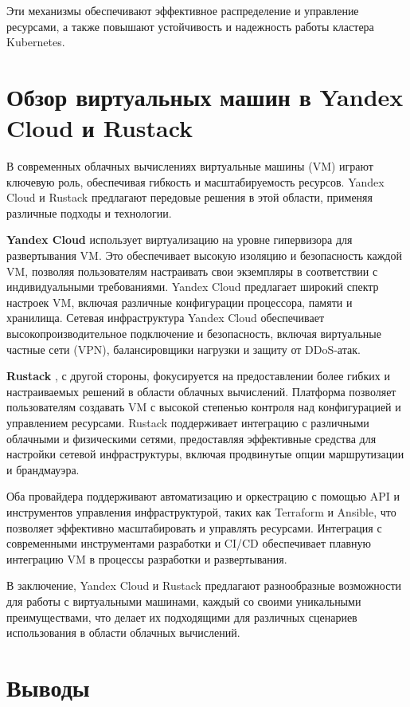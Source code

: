 Эти механизмы обеспечивают эффективное распределение и управление ресурсами, а
также повышают устойчивость и надежность работы кластера Kubernetes.

\section*{Обзор виртуальных машин в Yandex Cloud и Rustack}

В современных облачных вычислениях виртуальные машины (VM) играют ключевую роль,
обеспечивая гибкость и масштабируемость ресурсов. Yandex Cloud и Rustack
предлагают передовые решения в этой области, применяя различные подходы и
технологии.

\textbf{Yandex Cloud} \cite{yandexcloud} использует виртуализацию на уровне
гипервизора для
развертывания VM. Это обеспечивает высокую изоляцию и безопасность каждой VM,
позволяя пользователям настраивать свои экземпляры в соответствии с
индивидуальными требованиями. Yandex Cloud предлагает широкий спектр настроек
VM, включая различные конфигурации процессора, памяти и хранилища. Сетевая
инфраструктура Yandex Cloud обеспечивает высокопроизводительное подключение и
безопасность, включая виртуальные частные сети (VPN), балансировщики нагрузки и
защиту от DDoS-атак.

\textbf{Rustack} \cite{rustack}, с другой стороны, фокусируется на предоставлении
более гибких
и настраиваемых решений в области облачных вычислений. Платформа позволяет
пользователям создавать VM с высокой степенью контроля над конфигурацией и
управлением ресурсами. Rustack поддерживает интеграцию с различными облачными и
физическими сетями, предоставляя эффективные средства для настройки сетевой
инфраструктуры, включая продвинутые опции маршрутизации и брандмауэра.

Оба провайдера поддерживают автоматизацию и оркестрацию с помощью API и
инструментов управления инфраструктурой, таких как Terraform и Ansible, что
позволяет эффективно масштабировать и управлять ресурсами. Интеграция с
современными инструментами разработки и CI/CD обеспечивает плавную интеграцию VM
в процессы разработки и развертывания.

В заключение, Yandex Cloud и Rustack предлагают разнообразные возможности для
работы с виртуальными машинами, каждый со своими уникальными преимуществами, что
делает их подходящими для различных сценариев использования в области облачных
вычислений.

\section{Выводы}

